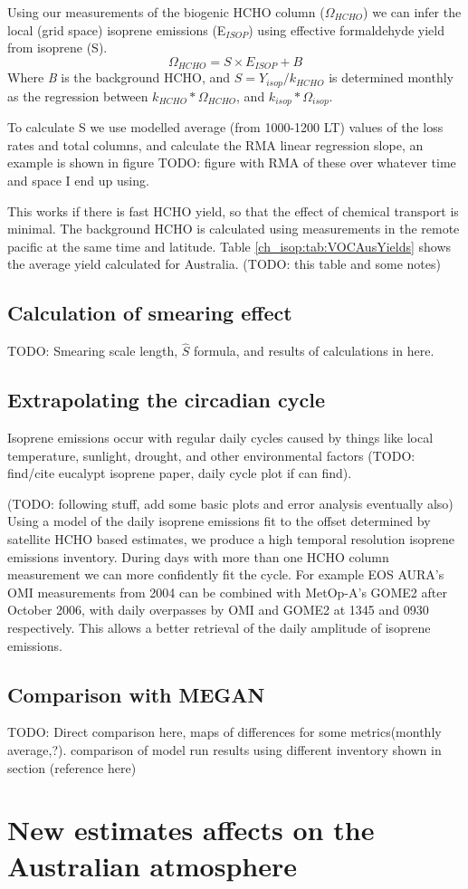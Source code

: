     Using our measurements of the biogenic HCHO column ($\Omega_{HCHO}$) we can infer the local (grid space) isoprene emissions (E$_{ISOP}$) using effective formaldehyde yield from isoprene (S).
    \begin{equation} \label{ch_isop:eqn:isop_yield}
      \Omega_{HCHO} = S \times E_{ISOP} + B
    \end{equation}
    Where \textit{B} is the background HCHO, and $S = Y_{isop}/k_{HCHO}$ is determined monthly as the regression between $k_{HCHO}*\Omega_{HCHO}$, and $k_{isop}*\Omega_{isop}$.
    
    To calculate S we use modelled average (from 1000-1200 LT) values of the loss rates and total columns, and calculate the RMA linear regression slope, an example is shown in figure TODO: figure with RMA of these over whatever time and space I end up using.
    
    
    This works if there is fast HCHO yield, so that the effect of chemical transport is minimal.
    The background HCHO is calculated using measurements in the remote pacific at the same time and latitude.
    Table \ref{ch_isop:tab:VOCAusYields} shows the average yield calculated for Australia. (TODO: this table and some notes)
    
  \subsection{Calculation of smearing effect}
    TODO: Smearing scale length, $\hat{S}$ formula, and results of calculations in here.
    
    
  \subsection{Extrapolating the circadian cycle}
    Isoprene emissions occur with regular daily cycles caused by things like local temperature, sunlight, drought, and other environmental factors (TODO: find/cite eucalypt isoprene paper, daily cycle plot if can find).
    
    (TODO: following stuff, add some basic plots and error analysis eventually also)
    Using a model of the daily isoprene emissions fit to the offset determined by satellite HCHO based estimates, we produce a high temporal resolution isoprene emissions inventory.
    During days with more than one HCHO column measurement we can more confidently fit the cycle. 
    For example EOS AURA's OMI measurements from 2004 can be combined with MetOp-A's GOME2 after October 2006, with daily overpasses by OMI and GOME2 at 1345 and 0930 respectively.
    This allows a better retrieval of the daily amplitude of isoprene emissions.
    
  \subsection{Comparison with MEGAN}
    TODO: Direct comparison here, maps of differences for some metrics(monthly average,?). comparison of model run results using different inventory shown in section (reference here)

\section{New estimates affects on the Australian atmosphere}

